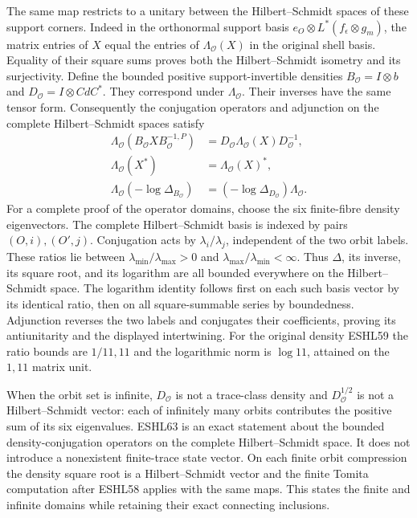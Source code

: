 \documentclass[
  10pt,
  a4paper,
]{article}
\begin{document}
The same map restricts to a unitary between the Hilbert--Schmidt spaces
of these support corners. Indeed in the orthonormal support basis
\(e_O\otimes L^*(f_\epsilon\otimes g_m)\), the matrix entries of \(X\)
equal the entries of \(\Lambda_{\mathcal O}(X)\) in the original shell
basis. Equality of their square sums proves both the Hilbert--Schmidt
isometry and its surjectivity. Define the bounded positive
support-invertible densities \(B_{\mathcal O}=I\otimes b\) and
\(D_{\mathcal O}=I\otimes CdC^*\). They correspond under
\(\Lambda_{\mathcal O}\). Their inverses have the same tensor form.
Consequently the conjugation operators and adjunction on the complete
Hilbert--Schmidt spaces satisfy \[
\begin{aligned}
\Lambda_{\mathcal O}(B_{\mathcal O}XB_{\mathcal O}^{-1,P})
&=D_{\mathcal O}\Lambda_{\mathcal O}(X)D_{\mathcal O}^{-1},\\
\Lambda_{\mathcal O}(X^*)&=\Lambda_{\mathcal O}(X)^*,\\
\Lambda_{\mathcal O}(-\log\Delta_{B_{\mathcal O}})
&=(-\log\Delta_{D_{\mathcal O}})\Lambda_{\mathcal O}.
\end{aligned}
\tag{ESHL63}
\] For a complete proof of the operator domains, choose the six
finite-fibre density eigenvectors. The complete Hilbert--Schmidt basis
is indexed by pairs \((O,i),(O',j)\). Conjugation acts by
\(\lambda_i/\lambda_j\), independent of the two orbit labels. These
ratios lie between \(\lambda_{\min}/\lambda_{\max}>0\) and
\(\lambda_{\max}/\lambda_{\min}<\infty\). Thus \(\Delta\), its inverse,
its square root, and its logarithm are all bounded everywhere on the
Hilbert--Schmidt space. The logarithm identity follows first on each
such basis vector by its identical ratio, then on all square-summable
series by boundedness. Adjunction reverses the two labels and conjugates
their coefficients, proving its antiunitarity and the displayed
intertwining. For the original density ESHL59 the ratio bounds are
\(1/11,11\) and the logarithmic norm is \(\log11\), attained on the
\(1,11\) matrix unit.

When the orbit set is infinite, \(D_{\mathcal O}\) is not a trace-class
density and \(D_{\mathcal O}^{1/2}\) is not a Hilbert--Schmidt vector:
each of infinitely many orbits contributes the positive sum of its six
eigenvalues. ESHL63 is an exact statement about the bounded
density-conjugation operators on the complete Hilbert--Schmidt space. It
does not introduce a nonexistent finite-trace state vector. On each
finite orbit compression the density square root is a Hilbert--Schmidt
vector and the finite Tomita computation after ESHL58 applies with the
same maps. This states the finite and infinite domains while retaining
their exact connecting inclusions.
\end{document}
